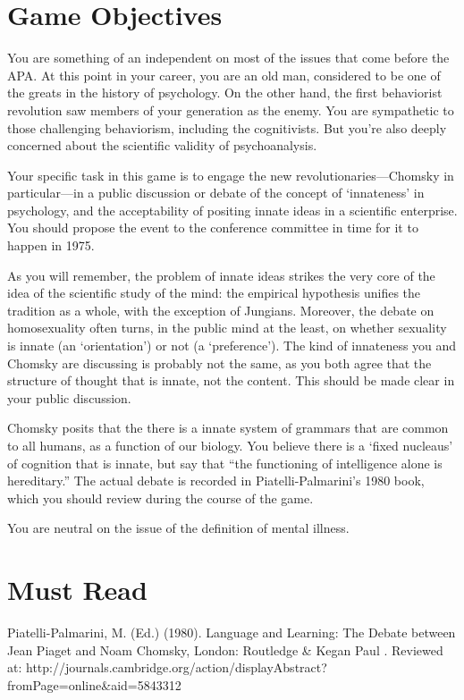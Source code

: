 \section{Game Objectives}
\label{gameobjectives}

You are something of an independent on most of the issues that come before the APA. At this point in your career, you are an old man, considered to be one of the greats in the history of psychology. On the other hand, the first behaviorist revolution saw members of your generation as the enemy. You are sympathetic to those challenging behaviorism, including the cognitivists. But you're also deeply concerned about the scientific validity of psychoanalysis.

Your specific task in this game is to engage the new revolutionaries---Chomsky in particular---in a public discussion or debate of the concept of `innateness' in psychology, and the acceptability of positing innate ideas in a scientific enterprise. You should propose the event to the conference committee in time for it to happen in 1975.

As you will remember, the problem of innate ideas strikes the very core of the idea of the scientific study of the mind: the empirical hypothesis unifies the tradition as a whole, with the exception of Jungians. Moreover, the debate on homosexuality often turns, in the public mind at the least, on whether sexuality is innate (an `orientation') or not (a `preference'). The kind of innateness you and Chomsky are discussing is probably not the same, as you both agree that the structure of thought that is innate, not the content. This should be made clear in your public discussion.

Chomsky posits that the there is a innate system of grammars that are common to all humans, as a function of our biology. You believe there is a `fixed nucleaus' of cognition that is innate, but say that ``the functioning of intelligence alone is hereditary.'' The actual debate is recorded in Piatelli-Palmarini's 1980 book, which you should review during the course of the game.

You are neutral on the issue of the definition of mental illness.

\section{Must Read}
\label{mustread}

Piatelli-Palmarini, M. (Ed.) (1980). Language and Learning: The Debate between Jean Piaget and Noam Chomsky, London: Routledge \& Kegan Paul . Reviewed at: http:\slash \slash journals.cambridge.org\slash action\slash displayAbstract?fromPage=online\&aid=5843312

